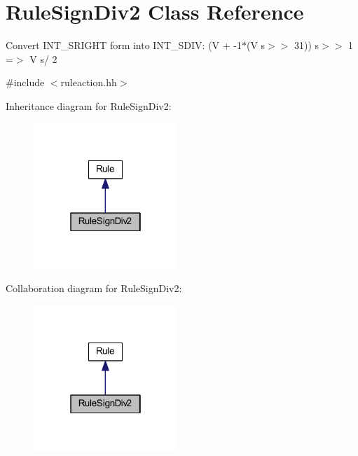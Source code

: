 \hypertarget{class_rule_sign_div2}{}\section{Rule\+Sign\+Div2 Class Reference}
\label{class_rule_sign_div2}


Convert I\+N\+T\+\_\+\+S\+R\+I\+G\+HT form into I\+N\+T\+\_\+\+S\+D\+IV\+: {\ttfamily (V + -\/1$\ast$(V s$>$$>$ 31)) s$>$$>$ 1 =$>$ V s/ 2}  




{\ttfamily \#include $<$ruleaction.\+hh$>$}



Inheritance diagram for Rule\+Sign\+Div2\+:
\nopagebreak
\begin{figure}[H]
\begin{center}
\leavevmode
\includegraphics[width=154pt]{class_rule_sign_div2__inherit__graph}
\end{center}
\end{figure}


Collaboration diagram for Rule\+Sign\+Div2\+:
\nopagebreak
\begin{figure}[H]
\begin{center}
\leavevmode
\includegraphics[width=154pt]{class_rule_sign_div2__coll__graph}
\end{center}
\end{figure}
